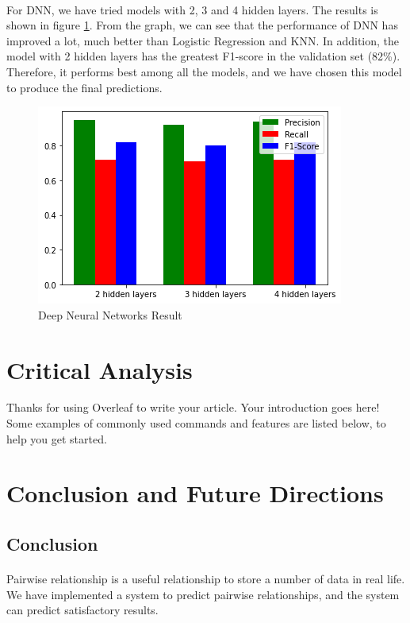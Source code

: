 \documentclass[fleqn,11pt]{olplainarticle}
\begin{document}
\paragraph*{}
For DNN, we have tried models with 2, 3 and 4 hidden layers. The results is shown in figure \ref{fig:res}. From the graph, we can see that the performance of DNN has improved a lot, much better than Logistic Regression and KNN. In addition, the model with 2 hidden layers has the greatest F1-score in the validation set (82\%). Therefore, it performs best among all the models, and we have chosen this model to produce the final predictions.
\begin{figure}[H]
	\centering
	\includegraphics[scale=0.5]{result.png}
	\caption{Deep Neural Networks Result}
	\label{fig:res}
\end{figure}


\section{Critical Analysis}\label{analysis}
Thanks for using Overleaf to write your article. Your introduction goes here! Some examples of commonly used commands and features are listed below, to help you get started.

\section{Conclusion and Future Directions}\label{conclu}
\subsection{Conclusion}\label{con}
\paragraph*{}
Pairwise relationship is a useful relationship to store a number of data in real life. We have implemented a system to predict pairwise relationships, and the system can predict satisfactory results.
\end{document}
